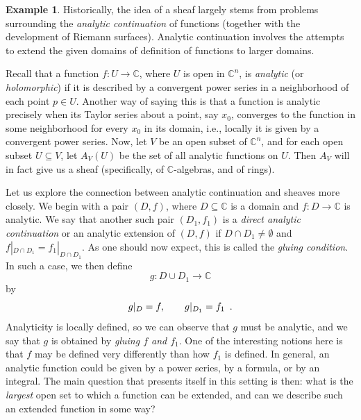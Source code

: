 \documentclass[a4paper]{book}
\theoremstyle{definition}
\newtheorem{example}{Example}[section]
\theoremstyle{definition}
\theoremstyle{definition}
\theoremstyle{theorem}
\theoremstyle{definition}
\begin{document}
\begin{example}
	Historically, the idea of a sheaf largely stems from problems surrounding the \textit{analytic continuation} of functions (together with the development of Riemann surfaces). Analytic continuation involves the attempts to extend the given domains of definition of functions to larger domains. \par 
	Recall that a function $f: U \rightarrow \mathbb{C}$, where $U$ is open in $\mathbb{C}^n$, is \textit{analytic} (or \textit{holomorphic}) if it is described by a convergent power series in a neighborhood of each point $p \in U$. Another way of saying this is that a function is analytic precisely when its Taylor series about a point, say $x_0$, converges to the function in some neighborhood for every $x_0$ in its domain, i.e., locally it is given by a convergent power series. Now, let $V$ be an open subset of $\mathbb{C}^n$, and for each open subset $U \subseteq V$, let $A_V (U)$ be the set of all analytic functions on $U$. Then $A_V$ will in fact give us a sheaf (specifically, of $\mathbb{C}$-algebras, and of rings).\par 
	Let us explore the connection between analytic continuation and sheaves more closely. We begin with a pair $(D, f)$, where $D \subseteq \mathbb{C}$ is a domain and $f: D \rightarrow \mathbb{C}$ is analytic. We say that another such pair $(D_1, f_1)$ is a \textit{direct analytic continuation} or an analytic extension of $(D, f)$ if $D \cap D_1 \neq \emptyset$ and $f|_{D \cap D_1} = f_1|_{D \cap D_1}$. As one should now expect, this is called the \textit{gluing condition}. In such a case, we then define 
	\begin{equation*}
	g: D \cup D_1 \rightarrow \mathbb{C} 
	\end{equation*}
	by 
	\begin{equation*}
	g|_D = f, \hspace{2em} g|_{D_1} = f_1 \hspace*{0.5em} .
	\end{equation*} 
	Analyticity is locally defined, so we can observe that $g$ must be analytic, and we say that $g$ is obtained by \textit{gluing $f$ and $f_1$}. One of the interesting notions here is that $f$ may be defined very differently than how $f_1$ is defined. In general, an analytic function could be given by a power series, by a formula, or by an integral. The main question that presents itself in this setting is then: what is the \textit{largest} open set to which a function can be extended, and can we describe such an extended function in some way?\par 

\end{example}
\end{document}
